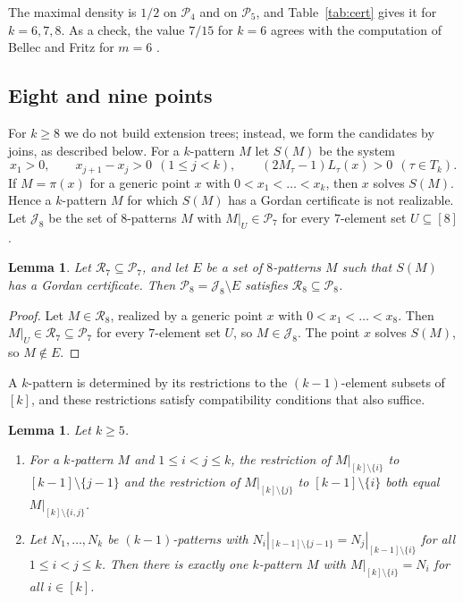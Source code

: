 \documentclass[11pt]{amsart}
\newtheorem{lemma}[theorem]{Lemma}
\theoremstyle{definition}
\theoremstyle{remark}
\numberwithin{equation}{section}
\newcommand{\cR}{\mathcal{R}}
\newcommand{\cP}{\mathcal{P}}
\newcommand{\cJ}{\mathcal{J}}
\begin{document}
The maximal density is $1/2$ on $\cP_4$ and on $\cP_5$, and Table~\ref{tab:cert} gives it for $k=6,7,8$. As a check, the value $7/15$ for $k=6$ agrees with the computation of Bellec and Fritz for $m=6$ \cite[Section~4]{BF26}.

\subsection*{Eight and nine points}
For $k\ge8$ we do not build extension trees; instead, we form the candidates by joins, as described below. For a $k$-pattern $M$ let $S(M)$ be the system
\[
x_1>0,\qquad x_{j+1}-x_j>0\ \ (1\le j<k),\qquad (2M_\tau-1)L_\tau(x)>0\ \ (\tau\in T_k).
\]
If $M=\pi(x)$ for a generic point $x$ with $0<x_1<\dots<x_k$, then $x$ solves $S(M)$. Hence a $k$-pattern $M$ for which $S(M)$ has a Gordan certificate is not realizable. Let $\cJ_8$ be the set of $8$-patterns $M$ with $M|_U\in\cP_7$ for every $7$-element set $U\subseteq[8]$.

\begin{lemma}\label{lem:excl}
Let $\cR_7\subseteq\cP_7$, and let $E$ be a set of $8$-patterns $M$ such that $S(M)$ has a Gordan certificate. Then $\cP_8=\cJ_8\setminus E$ satisfies $\cR_8\subseteq\cP_8$.
\end{lemma}

\begin{proof}
Let $M\in\cR_8$, realized by a generic point $x$ with $0<x_1<\dots<x_8$. Then $M|_U\in\cR_7\subseteq\cP_7$ for every $7$-element set $U$, so $M\in\cJ_8$. The point $x$ solves $S(M)$, so $M\notin E$.
\end{proof}

A $k$-pattern is determined by its restrictions to the $(k-1)$-element subsets of $[k]$, and these restrictions satisfy compatibility conditions that also suffice.

\begin{lemma}\label{lem:glue}
Let $k\ge5$.
\begin{enumerate}[label=\textup{(\alph*)}]
\item For a $k$-pattern $M$ and $1\le i<j\le k$, the restriction of $M|_{[k]\setminus\{i\}}$ to $[k-1]\setminus\{j-1\}$ and the restriction of $M|_{[k]\setminus\{j\}}$ to $[k-1]\setminus\{i\}$ both equal $M|_{[k]\setminus\{i,j\}}$.
\item Let $N_1,\dots,N_k$ be $(k-1)$-patterns with $N_i|_{[k-1]\setminus\{j-1\}}=N_j|_{[k-1]\setminus\{i\}}$ for all $1\le i<j\le k$. Then there is exactly one $k$-pattern $M$ with $M|_{[k]\setminus\{i\}}=N_i$ for all $i\in[k]$.
\end{enumerate}
\end{lemma}
\end{document}
